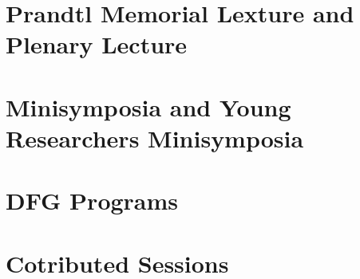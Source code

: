 \documentclass[colorlinks]{gamm-boa}
\begin{document}
 \tableofcontents

{\color{primary}%
\chapter{Prandtl Memorial Lexture and Plenary Lecture}}









{\color{primary}%
\chapter{Minisymposia and Young Researchers Minisymposia}}










{\color{primary}%
\chapter{DFG Programs}}






{\color{primary}%
\chapter{Cotributed Sessions}}



























\end{document}
